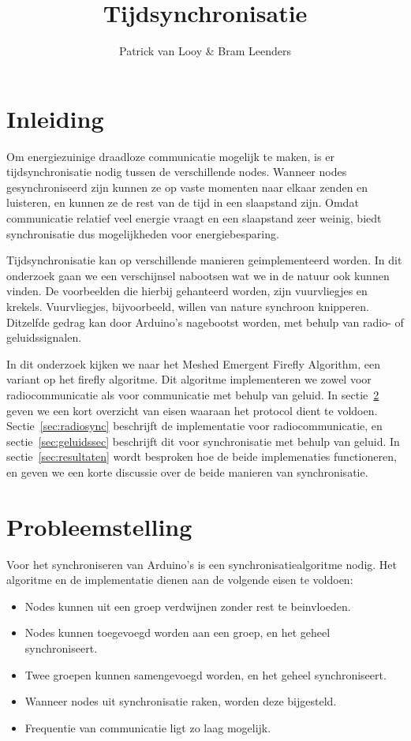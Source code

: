 \documentclass[a4paper,10pt]{article}
\title{Tijdsynchronisatie}
\author{Patrick van Looy \& Bram Leenders}
\begin{document}
\maketitle

\section{Inleiding}
Om energiezuinige draadloze communicatie mogelijk te maken, is er tijdsynchronisatie nodig tussen de verschillende nodes. Wanneer nodes gesynchroniseerd zijn kunnen ze op vaste momenten naar elkaar zenden en luisteren, en kunnen ze de rest van de tijd in een slaapstand zijn. Omdat communicatie relatief veel energie vraagt en een slaapstand zeer weinig, biedt synchronisatie dus mogelijkheden voor energiebesparing.

Tijdsynchronisatie kan op verschillende manieren geimplementeerd worden. In dit onderzoek gaan we een verschijnsel nabootsen wat we in de natuur ook kunnen vinden. De voorbeelden die hierbij gehanteerd worden, zijn vuurvliegjes en krekels. Vuurvliegjes, bijvoorbeeld, willen van nature synchroon knipperen\cite{buck1988synchronous}. Ditzelfde gedrag kan door Arduino's nagebootst worden, met behulp van radio- of geluidssignalen.

In dit onderzoek kijken we naar het Meshed Emergent Firefly Algorithm\cite{tyrrell2010emergent}, een variant op het firefly algoritme\cite{leidenfrost2009firefly, yang2013firefly}. Dit algoritme implementeren we zowel voor radiocommunicatie als voor communicatie met behulp van geluid. In sectie~\ref{sec:probleemstelling} geven we een kort overzicht van eisen waaraan het protocol dient te voldoen. Sectie~\ref{sec:radiosync} beschrijft de implementatie voor radiocommunicatie, en sectie~\ref{sec:geluidssec} beschrijft dit voor synchronisatie met behulp van geluid. In sectie~\ref{sec:resultaten} wordt besproken hoe de beide implemenaties functioneren, en geven we een korte discussie over de beide manieren van synchronisatie.

\section{Probleemstelling}\label{sec:probleemstelling}
Voor het synchroniseren van Arduino's is een synchronisatiealgoritme nodig. Het algoritme en de implementatie dienen aan de volgende eisen te voldoen:
\begin{itemize}
    \item Nodes kunnen uit een groep verdwijnen zonder rest te beinvloeden.
    \item Nodes kunnen toegevoegd worden aan een groep, en het geheel synchroniseert.
    \item Twee groepen kunnen samengevoegd worden, en het geheel synchroniseert.
    \item Wanneer nodes uit synchronisatie raken, worden deze bijgesteld.
    \item Frequentie van communicatie ligt zo laag mogelijk.
\end{itemize}
\end{document}
